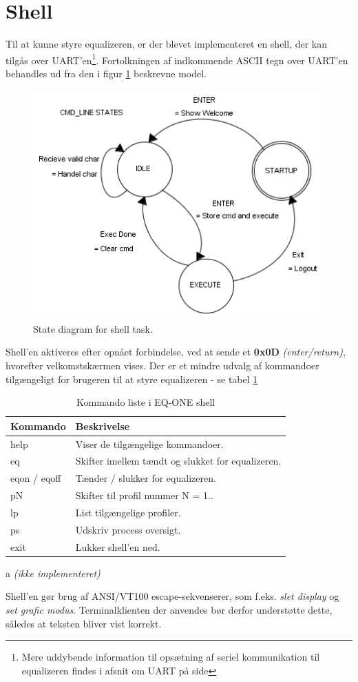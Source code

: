 \section{Shell}
Til at kunne styre equalizeren, er der blevet implementeret en shell, der kan tilgås over UART'en\footnote{Mere uddybende information til opsætning af seriel kommunikation til equalizeren findes i afsnit om UART på side \pageref{subsec:uart}}.
Fortolkningen af indkommende ASCII tegn over UART'en behandles ud fra den i figur \ref{fig:shell_task} beskrevne model.

\begin{figure}[h!]
	\centering
	\includegraphics[width=.6\textwidth]{billeder/cmd_states.png}
	\caption{State diagram for shell task.}
	\label{fig:shell_task}
\end{figure}

Shell'en aktiveres efter opnået forbindelse, ved at sende et \textbf{0x0D} \textit{(enter/return)}, hvorefter velkomstskærmen vises.
Der er et mindre udvalg af kommandoer tilgængeligt for brugeren til at styre equalizeren - se tabel \ref{tab:shell_cmd} 

\begin{table}[h!]
	\caption{Kommando liste i EQ-ONE shell}
	\label{tab:shell_cmd}
	\begin{threeparttable}
		\begin{tabular}{l p{}}
			\toprule
			\textbf{Kommando}      & \textbf{Beskrivelse}   \\ 
			\midrule
			help		& Viser de tilgængelige kommandoer. \\
			eq       	& Skifter imellem tændt og slukket for equalizeren. \\
			eqon / eqoff & Tænder / slukker for equalizeren. \tnote{a}\\
			pN			& Skifter til profil nummer N = 1.. \\
			lp			& List tilgængelige profiler.\tnote{a}\\
			ps		    & Udskriv process oversigt. \\
			exit 		& Lukker shell'en ned. \\
			\bottomrule
		\end{tabular}
		
		\begin{tablenotes}
			\item[a] \textit{(ikke implementeret)}
		\end{tablenotes}
	\end{threeparttable}
\end{table}

Shell'en gør brug af ANSI/VT100 escape-sekvenserer, som f.eks. \textit{slet display} og \textit{set grafic modus}.
Terminalklienten der anvendes bør derfor understøtte dette, således at teksten bliver vist korrekt.







